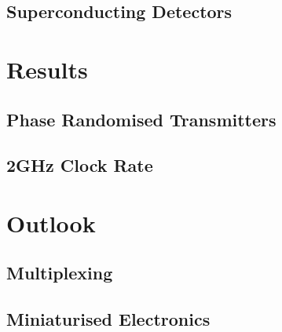 \subsection{Superconducting Detectors}

\section{Results}

\subsection{Phase Randomised Transmitters}

\subsection{2GHz Clock Rate}

\section{Outlook}

\subsection{Multiplexing}

\subsection{Miniaturised Electronics}


